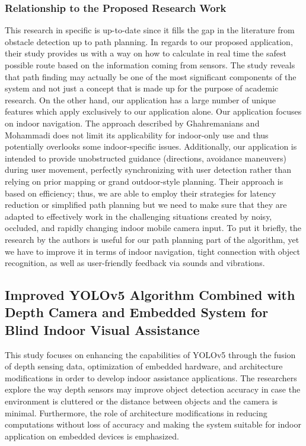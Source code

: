 \documentclass{FastFyp}
\begin{document}
\subsubsection{Relationship to the Proposed Research Work}  
This research in specific is up-to-date since it fills the gap in the literature from obstacle detection up to path planning. In regards to our proposed application, their study provides us with a way on how to calculate in real time the safest possible route based on the information coming from sensors. The study reveals that path finding may actually be one of the most significant components of the system and not just a concept that is made up for the purpose of academic research. On the other hand, our application has a large number of unique features which apply exclusively to our application alone. Our application focuses on indoor navigation. The approach described by Ghahremanians and Mohammadi \cite{ref:ghahremanians2025efficient} does not limit its applicability for indoor-only use and thus potentially overlooks some indoor-specific issues. Additionally, our application is intended to provide unobstructed guidance (directions, avoidance maneuvers) during user movement, perfectly synchronizing with user detection rather than relying on prior mapping or grand outdoor-style planning. Their approach is based on efficiency; thus, we are able to employ their strategies for latency reduction or simplified path planning but we need to make sure that they are adapted to effectively work in the challenging situations created by noisy, occluded, and rapidly changing indoor mobile camera input. To put it briefly, the research by the authors is useful for our path planning part of the algorithm, yet we have to improve it in terms of indoor navigation, tight connection with object recognition, as well as user-friendly feedback via sounds and vibrations.


\subsection{Improved YOLOv5 Algorithm Combined with Depth Camera and Embedded System for Blind Indoor Visual Assistance}
This study focuses on enhancing the capabilities of YOLOv5 through the fusion of depth sensing data, optimization of embedded hardware, and architecture modifications in order to develop indoor assistance applications. The researchers explore the way depth sensors may improve object detection accuracy in case the environment is cluttered or the distance between objects and the camera is minimal. Furthermore, the role of architecture modifications in reducing computations without loss of accuracy and making the system suitable for indoor application on embedded devices is emphasized.
\end{document}
